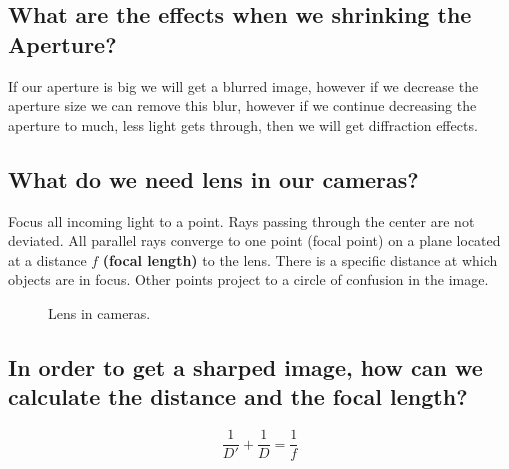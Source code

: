 \documentclass{article}
\begin{document}
\subsection{What are the effects when we shrinking the Aperture?}
If our aperture is big we will get a blurred image, however if we decrease the aperture size
we can remove this blur, however if we continue decreasing the aperture to much, less light gets
through, then we will get diffraction effects.

\subsection{What do we need lens in our cameras?}
Focus all incoming light  to a point. Rays passing through the center are not deviated. All
parallel rays converge to one point (focal point) on a plane located at a distance \(f\)
\textbf{(focal length)} to the lens. There is a specific distance at which objects are in focus.
Other points project to a circle of confusion in the image.

\begin{figure}[h!]
\centering     %
{}
\caption{Lens in cameras.}
\label{fig:lens}
\end{figure}

\subsection{In order to get a sharped image, how can we calculate the distance and the focal
length?}
\[\frac{1}{D'} + \frac{1}{D} = \frac{1}{f}\]
\end{document}
